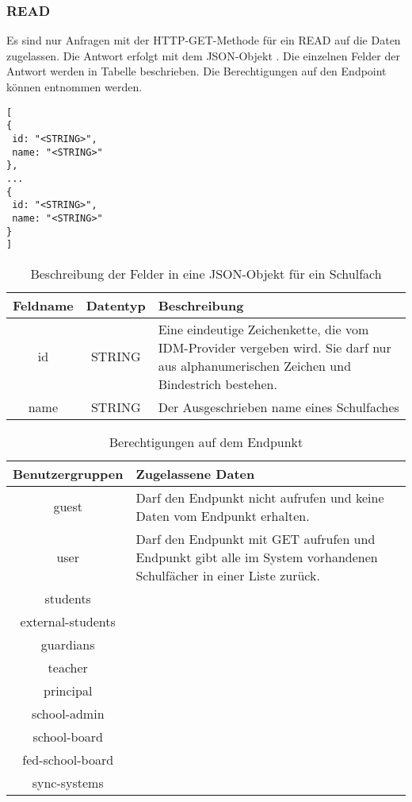\subsubsection{READ}
\label{sec:rest:api:school-subjects:read}
Es sind nur Anfragen mit der HTTP-GET-Methode für ein READ auf die Daten zugelassen.
Die Antwort erfolgt mit dem JSON-Objekt . Die einzelnen Felder der Antwort werden in Tabelle  beschrieben.
Die Berechtigungen auf den Endpoint können  entnommen werden.

\begin{lstlisting}[caption={JSON-Antwort für einen GET-Aufruf der Route /api/school-subjects},label={lst:code:rest:api:school-subjects:read:ret},frame=tlrb]
[
{
 id: "<STRING>",
 name: "<STRING>"
},
...
{
 id: "<STRING>",
 name: "<STRING>"
}
]
\end{lstlisting}
\begin{table}[!htb]
	\begin{tabularx}{\textwidth}{|c|c|X|}
		\hline
			\textbf{Feldname} & \textbf{Datentyp} & \textbf{Beschreibung} \\ \hline
			id & STRING & Eine eindeutige Zeichenkette, die vom IDM-Provider vergeben wird. Sie darf nur aus alphanumerischen Zeichen und Bindestrich bestehen.\\ \hline
			name & STRING & Der Ausgeschrieben name eines Schulfaches \\ \hline
	\end{tabularx}

		\caption{Beschreibung der Felder in eine JSON-Objekt für ein Schulfach}
		\label{tab:rest:api:school-subjects:read:ret:json}
\end{table}
\begin{longtable}{|c|p{}|}
\caption{Berechtigungen auf dem Endpunkt}
\endfoot
		\caption{Berechtigungen auf dem Endpunkt}
		\label{tab:rest:api:school-subjects:read:right}
\endlastfoot 
\hline
\textbf{Benutzergruppen} & \textbf{Zugelassene Daten} \\ \hline
\endhead
guest & Darf den Endpunkt nicht aufrufen und keine Daten vom Endpunkt erhalten. \\ \hline
user & Darf den Endpunkt mit GET aufrufen und Endpunkt gibt alle im System vorhandenen Schulfächer in einer Liste zurück. \\ \hline
students &  \\ \hline
external-students &  \\ \hline
guardians &  \\ \hline
teacher &  \\ \hline
principal &  \\ \hline
school-admin &  \\ \hline
school-board &  \\ \hline
fed-school-board &  \\ \hline
sync-systems &  \\ \hline
	\end{longtable}
